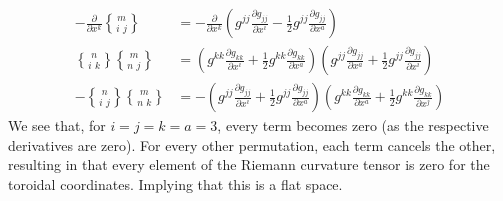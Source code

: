 \documentclass[main.tex]{subfiles}
\begin{document}
\begin{align}
-\frac{\partial}{\partial  x^k}{m \brace i\,\,j} &= 
-\frac{\partial}{\partial x^k} \left(g^{jj} \frac{\partial g_{jj}}{\partial x^i} - \frac{1}{2}g^{jj}\frac{\partial g_{jj}}{\partial x^a}\right) \\
{n \brace i\,\,k}{m \brace n\,\,j} &= 
\left(g^{kk} \frac{\partial g_{kk}}{\partial x^i} + \frac{1}{2}g^{kk}\frac{\partial g_{kk}}{\partial x^a}\right)
\left(g^{jj} \frac{\partial g_{jj}}{\partial x^a} + \frac{1}{2}g^{jj}\frac{\partial g_{jj}}{\partial x^i}\right)\\
- {n \brace i\,\,j}{m \brace n\,\,k} &=
- \left(g^{jj} \frac{\partial g_{jj}}{\partial x^i} + \frac{1}{2}g^{jj}\frac{\partial g_{jj}}{\partial x^a}\right)
\left(g^{kk} \frac{\partial g_{kk}}{\partial x^a} + \frac{1}{2}g^{kk}\frac{\partial g_{kk}}{\partial x^j}\right)
\end{align}
We see that, for $i = j = k = a = 3$, every term becomes zero (as the respective derivatives are zero). For every other
permutation, each term cancels the other, resulting in that every element of the Riemann curvature tensor is zero for
the toroidal coordinates. Implying that this is a flat space. 
\end{document}

